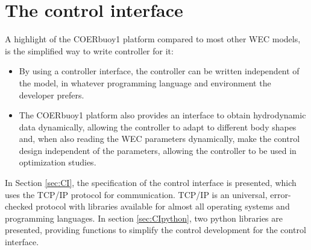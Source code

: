 \documentclass[oneside,10pt,a4paper]{book}
\begin{document}
\chapter{The control interface}\label{control_interface}
A highlight of the COERbuoy1 platform compared to most other WEC models, is the simplified way to write controller for it:
\begin{itemize}
	\item By using a controller interface, the controller can be written independent of the model, in whatever programming language and environment the developer prefers.
	\item The COERbuoy1 platform also provides an interface to obtain hydrodynamic data dynamically, allowing the controller to adapt to different body shapes and, when also reading the WEC parameters dynamically, make the control design independent of the parameters, allowing the controller to be used in optimization studies.
\end{itemize}
In Section \ref{sec:CI}, the specification of the control interface is presented, which uses the TCP/IP protocol for communication. TCP/IP is an universal, error-checked protocol with libraries available for almost all operating systems and programming languages. In section \ref{sec:CIpython}, two python libraries are presented, providing functions to simplify the control development for the control interface.
\end{document}
